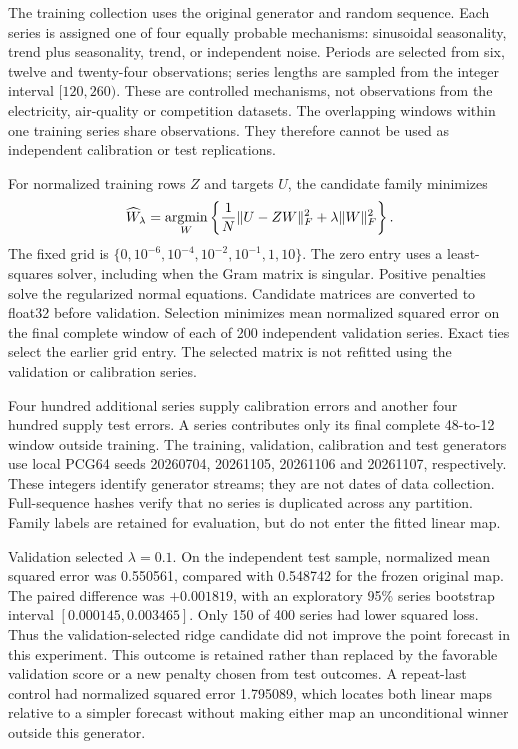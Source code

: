 The training collection uses the original generator and random sequence. Each
series is assigned one of four equally probable mechanisms: sinusoidal
seasonality, trend plus seasonality, trend, or independent noise. Periods are
selected from six, twelve and twenty-four observations; series lengths are
sampled from the integer interval $[120,260)$. These are controlled mechanisms,
not observations from the electricity, air-quality or competition datasets.
The overlapping windows within one training series share observations. They
therefore cannot be used as independent calibration or test replications.

For normalized training rows $Z$ and targets $U$, the candidate family minimizes
\begin{equation}
 \widehat W_\lambda=\mathop{\rm argmin}_{W}
 \left\{\frac{1}{N}\|U-ZW\|_F^2+\lambda\|W\|_F^2\right\}.
 \label{eq:browser-ridge}
\end{equation}
The fixed grid is $\{0,10^{-6},10^{-4},10^{-2},10^{-1},1,10\}$. The zero entry
uses a least-squares solver, including when the Gram matrix is singular.
Positive penalties solve the regularized normal equations. Candidate matrices
are converted to float32 before validation. Selection minimizes mean normalized
squared error on the final complete window of each of 200 independent
validation series. Exact ties select the earlier grid entry. The selected
matrix is not refitted using the validation or calibration series.

Four hundred additional series supply calibration errors and another four
hundred supply test errors. A series contributes only its final complete
48-to-12 window outside training. The training, validation, calibration and test
generators use local PCG64 seeds 20260704, 20261105, 20261106 and 20261107,
respectively. These integers identify generator streams; they are not dates of
data collection. Full-sequence hashes verify that no series is duplicated
across any partition. Family labels are retained for evaluation, but do not
enter the fitted linear map.

Validation selected $\lambda=0.1$. On the independent test sample, normalized
mean squared error was 0.550561, compared with 0.548742 for the frozen original
map. The paired difference was $+0.001819$, with an exploratory 95\% series
bootstrap interval $[0.000145,0.003465]$. Only 150 of 400 series had lower
squared loss. Thus the validation-selected ridge candidate did not improve the
point forecast in this experiment. This outcome is retained rather than
replaced by the favorable validation score or a new penalty chosen from test
outcomes. A repeat-last control had normalized squared error 1.795089, which
locates both linear maps relative to a simpler forecast without making either
map an unconditional winner outside this generator.

